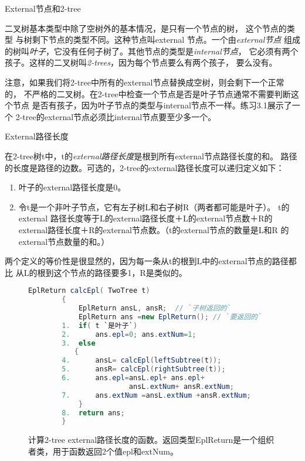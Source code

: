 \begin{definition}\label{Def:ExternalNodeAnd2_tree}
External节点和2-tree

二叉树基本类型中除了空树外的基本情况，是只有一个节点的树， 这个节点的类型
与树剩下节点的类型不同。这种节点叫external 节点。一个由\emph{external节点}
组成的树叫\emph{叶子}，它没有任何子树了。其他节点的类型是\emph{internal节点}，
它必须有两个孩子。这样的二叉树叫\emph{2-trees}，因为每个节点要么有两个孩子，
要么没有。
\end{definition}

注意，如果我们将2-tree中所有的external节点替换成空树，则会剩下一个正常的，
不严格的二叉树。在2-tree中检查一个节点是否是叶子节点通常不需要判断这个节点
是否有孩子，因为叶子节点的类型与internal节点不一样。练习3.1展示了一个
2-tree的external节点必须比internal节点要至少多一个。

\begin{definition}
External路径长度

在2-tree树t中，t的\emph{external路径长度}是根到所有external节点路径长度的和。
路径的长度是路径的边数。可选的，2-tree的external路径长度可以递归定义如下：
\begin{enumerate}
\item 叶子的external路径长度是0。
\item 令t是一个非叶子节点，它有左子树L和右子树R（两者都可能是叶子）。
        t的 external 路径长度等于L的external路径长度＋L的external节点数＋R的
        external路径长度＋R的external节点数。（t的external节点的数量是L和R
        的external节点数量的和。）
\end{enumerate}

两个定义的等价性是很显然的，因为每一条从t的根到L中的external节点的路径都比
从L的根到这个节点的路径要多1，R是类似的。
\end{definition}

\begin{figure*}[!t]
    \centering
    \begin{lstlisting}[language={Java}, keywordstyle=\color{blue!70}, commentstyle=\color{red!50!green!50!blue!50}]
        EplReturn calcEpl( TwoTree t)
        {
            EplReturn ansL, ansR;  // `子树返回的`
            EplReturn ans =new EplReturn(); // `要返回的`
        1.  if( t `是叶子`)
        2.      ans.epl=0; ans.extNum=1;
        3.  else
           {
        4.      ansL= calcEpl(leftSubtree(t));
        5.      ansR= calcEpl(rightSubtree(t));
        6.      ans.epl=ansL.epl+ ans.epl+
                        ansL.extNum+ ansR.extNum;
        7.      ans.extNum =ansL.extNum +ansR.extNum;
            }
        8.  return ans;
        }
    \end{lstlisting}
    \caption{计算2-tree external路径长度的函数。返回类型EplReturn是一个组织者类，用于函数返回2个值epl和extNum。}
    \label{Fig:LegthOf2-tree external}
\end{figure*}

